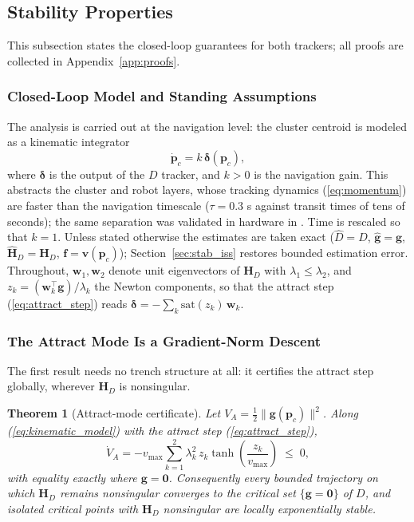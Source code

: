 \documentclass[lettersize,journal]{IEEEtran}
\newtheorem{theorem}{Theorem}
\begin{document}
\subsection{Stability Properties}
\label{sec:stability}

This subsection states the closed-loop guarantees for both trackers;
all proofs are collected in Appendix~\ref{app:proofs}.

\subsubsection{Closed-Loop Model and Standing Assumptions}

The analysis is carried out at the navigation level: the cluster
centroid is modeled as a kinematic integrator
\begin{equation}
    \dot{\mathbf{p}}_c = k\,\boldsymbol{\delta}(\mathbf{p}_c),
    \label{eq:kinematic_model}
\end{equation}
where $\boldsymbol{\delta}$ is the output of the $D$ tracker,
and $k > 0$ is the navigation gain. This abstracts the cluster and
robot layers, whose
tracking dynamics (\ref{eq:momentum}) are faster than the navigation
timescale ($\tau = 0.3$ s against transit times of tens of seconds);
the same separation was validated in hardware in \cite{14}. Time is rescaled
so that $k = 1$. Unless stated otherwise the estimates are taken exact
($\hat{D} = D$, $\hat{\mathbf{g}} = \mathbf{g}$, $\hat{\mathbf{H}}_D =
\mathbf{H}_D$, $\mathbf{f} = \mathbf{v}(\mathbf{p}_c)$);
Section~\ref{sec:stab_iss} restores bounded estimation error.
Throughout, $\mathbf{w}_1, \mathbf{w}_2$ denote unit eigenvectors of
$\mathbf{H}_D$ with $\lambda_1 \leq \lambda_2$, and $z_k =
(\mathbf{w}_k^\top \mathbf{g})/\lambda_k$ the Newton components, so
that the attract step (\ref{eq:attract_step}) reads
$\boldsymbol{\delta} = -\sum_k \mathrm{sat}(z_k)\,\mathbf{w}_k$.

\subsubsection{The Attract Mode Is a Gradient-Norm Descent}

The first result needs no trench structure at all: it certifies the attract step
globally, wherever $\mathbf{H}_D$ is nonsingular.

\begin{theorem}[Attract-mode certificate]
\label{thm:attract}
Let $V_A = \tfrac{1}{2}\|\mathbf{g}(\mathbf{p}_c)\|^2$. Along
(\ref{eq:kinematic_model}) with the attract step
(\ref{eq:attract_step}),
\begin{equation}
    \dot{V}_A = -v_{\max} \sum_{k=1}^{2} \lambda_k^2\,
    z_k \tanh\!\left(\frac{z_k}{v_{\max}}\right) \;\leq\; 0,
    \label{eq:VA_dot}
\end{equation}
with equality exactly where $\mathbf{g} = \mathbf{0}$. Consequently
every bounded trajectory on which $\mathbf{H}_D$ remains nonsingular
converges to the critical set $\{\mathbf{g} = \mathbf{0}\}$ of $D$, and
isolated critical points with $\mathbf{H}_D$ nonsingular are locally
exponentially stable.
\end{theorem}
\end{document}
